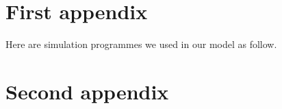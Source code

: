 \documentclass{mcmthesis}
\begin{document}
\newpage

\begin{appendices}
	
	\section{First appendix}
	
	\lipsum[13]
	
	Here are simulation programmes we used in our model as follow.\\
	
	
	\section{Second appendix}
	
	
	
\end{appendices}
	
	
\end{document}
